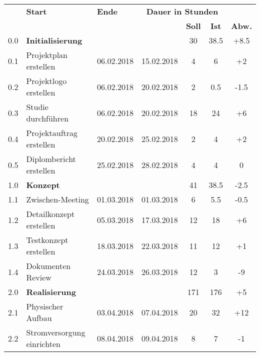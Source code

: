 \begin{table}[H]
\centering
\begin{tabular}{|p{0.7cm}p{6.8cm}p{2cm}p{2cm}|c|c|c|}

\hline
\rowcolor{heading}\multicolumn{2}{l}{\textbf{Aufgabe}} & \textbf{Start} & \textbf{Ende} & \multicolumn{3}{c|}{\textbf{Dauer in Stunden}} \\\cline{5-7} 
\rowcolor{heading}& & & & \textbf{Soll} & \textbf{Ist} & \textbf{Abw.} \\\hline
\rowcolor{subheading} 0.0 & \textbf{Initialisierung} & & & 30 & 38.5 & +8.5\\\hline
0.1 & Projektplan erstellen & 06.02.2018 & 15.02.2018  & 4 & 6 & +2 \\\hline
0.2 & Projektlogo erstellen & 06.02.2018 & 20.02.2018 & 2 & 0.5 & -1.5\\\hline
0.3 & Studie durchführen   & 06.02.2018 & 20.02.2018 & 18 & 24 & +6\\\hline
0.4 & Projektauftrag erstellen & 20.02.2018 & 25.02.2018 & 2 & 4 & +2\\\hline
0.5 & Diplombericht erstellen  & 25.02.2018 & 28.02.2018 & 4 & 4 & 0\\\hline
\rowcolor{subheading} 1.0 &\textbf{Konzept} & & & 41 & 38.5 & -2.5 \\\hline
1.1 & Zwischen-Meeting & 01.03.2018 & 01.03.2018 & 6 & 5.5 & -0.5\\\hline
1.2 & Detailkonzept erstellen & 05.03.2018 & 17.03.2018 & 12 & 18 & +6\\\hline
1.3 & Testkonzept erstellen & 18.03.2018 & 22.03.2018 & 11 & 12 & +1\\\hline
1.4 & Dokumenten Review & 24.03.2018 & 26.03.2018  & 12 & 3 & -9 \\\hline
\hline
\rowcolor{subheading} 2.0 & \textbf{Realisierung} & & & 171 & 176 & +5\\\hline
2.1 & Physischer Aufbau & 03.04.2018 & 07.04.2018 & 20 & 32 & +12 \\\hline
2.2 & Stromversorgung einrichten & 08.04.2018 & 09.04.2018 & 8 & 7 & -1 \\\hline

\end{tabular}
\end{table}
